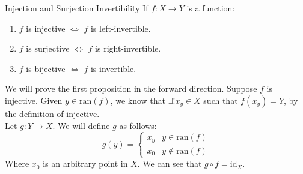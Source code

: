 \documentclass[10pt]{extarticle}
\begin{document}
  \begin{problem}{Injection and Surjection Invertibility}
    If $f:X\rightarrow Y$ is a function:
    \begin{enumerate}
      \item $f$ is injective $\Leftrightarrow$ $f$ is left-invertible.
      \item $f$ is surjective $\Leftrightarrow$ $f$ is right-invertible.
      \item $f$ is bijective $\Leftrightarrow$ $f$ is invertible.
    \end{enumerate}
    \tcblower
    We will prove the first proposition in the forward direction. Suppose $f$ is injective. Given $y\in \text{ran}(f)$, we know that $\exists! x_y\in X$ such that $f(x_y) = Y$, by the definition of injective.\\

    Let $g:Y\rightarrow X$. We will define $g$ as follows:
    \[
      g(y) = \begin{cases}
        x_y & y\in \text{ran}(f) \\
        x_0 & y\notin \text{ran}(f)
      \end{cases}
    \] 
    Where $x_0$ is an arbitrary point in $X$. We can see that $g\circ f = \text{id}_X$.
  \end{problem}
\end{document}
